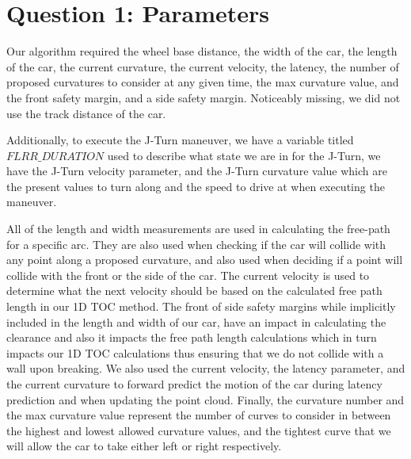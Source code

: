 \section{Question 1: Parameters} 
Our algorithm required the wheel base distance, the width of the car, the length of the car, the current curvature, the current velocity, the latency, the number of proposed curvatures to consider at any given time, the max curvature value, and the front safety margin, and a side safety margin. Noticeably missing, we did not use the track distance of the car. 

Additionally, to execute the J-Turn maneuver, we have a variable titled $FLRR\_DURATION$ used to describe what state we are in for the J-Turn, we have the J-Turn velocity parameter, and the J-Turn curvature value which are the present values to turn along and the speed to drive at when executing the maneuver. 

All of the length and width measurements are used in calculating the free-path for a specific arc. They are also used when checking if the car will collide with any point along a proposed curvature, and also used when deciding if a point will collide with the front or the side of the car. The current velocity is used to determine what the next velocity should be based on the calculated free path length in our 1D TOC method. The front of side safety margins while implicitly included in the length and width of our car, have an impact in calculating the clearance and also it impacts the free path length calculations which in turn impacts our 1D TOC calculations thus ensuring that we do not collide with a wall upon breaking. We also used the current velocity, the latency parameter, and the current curvature to forward predict the motion of the car during latency prediction and when updating the point cloud. Finally, the curvature number and the max curvature value represent the number of curves to consider in between the highest and lowest allowed curvature values, and the tightest curve that we will allow the car to take either left or right respectively. 